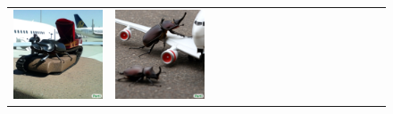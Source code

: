 \begin{figure}
\begin{adjustwidth}{-0.8in}{-0.5in}
\begin{tabular}{cccccccccccccccccccc}
\multicolumn{3}{c}{\includegraphics[width=\twobytwocolwidth\textwidth]{figures/limitations/rhino1.jpg}} &
\multicolumn{3}{c}{\includegraphics[width=\twobytwocolwidth\textwidth]{figures/limitations/rhino2.jpg}} \\

\end{tabular}
\end{adjustwidth}
\end{figure}
